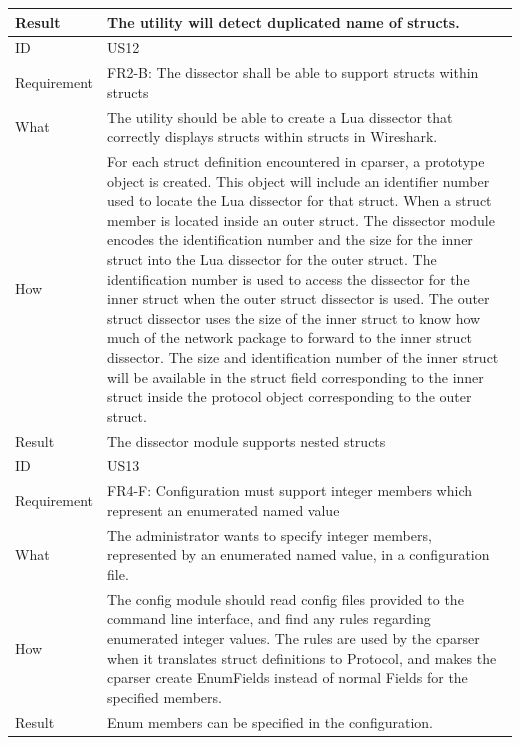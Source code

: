 \begin{table}[htbp]
{\begin{tabularx}{1.2\textwidth}{l X}
	Result & The utility will detect duplicated name of structs. \\
	\midrule
	ID & US12 \\
	Requirement & FR2-B: The dissector shall be able to support structs within structs \\
	What & The utility should be able to create a Lua dissector that correctly
	displays structs within structs in Wireshark. \\
	How & For each struct definition encountered in cparser, a prototype object is created. This object will include an 	identifier number used to locate
		the Lua dissector for that struct. When a struct member is located inside an outer struct. The dissector module encodes the identification number 
		and the size for the inner struct into the Lua dissector for the outer struct. The identification number is used to access the dissector for the inner
		struct when the outer struct dissector is used. The outer struct dissector uses the size of the inner struct to know how much of the network package
		to forward to the inner struct dissector. The size and identification number of the inner struct will be available in the struct field corresponding to
		the inner struct inside the protocol object corresponding to the outer struct.  \\
	Result & The dissector module supports nested structs \\
	\midrule
	ID & US13 \\
	Requirement & FR4-F: Configuration must support integer members which represent an enumerated named value \\
	What & The administrator wants to specify integer members, represented by an enumerated named value, in a configuration file. \\
	How & The config module should read config files provided to the command line interface, and find any rules regarding enumerated integer values.
		The rules are used by the cparser when it translates 	struct definitions to Protocol, and makes the cparser create EnumFields instead of normal
		Fields for the specified members. \\
	Result & Enum members can be specified in the configuration. \\
	\bottomrule
\end{tabularx}}
\end{table}

